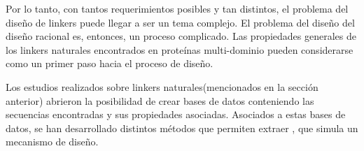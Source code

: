 Por lo tanto, con tantos requerimientos posibles y tan distintos, el problema del diseño de linkers puede llegar a ser un tema complejo.
El problema del diseño del diseño racional es, entonces, un proceso complicado.
Las propiedades generales de los linkers naturales encontrados en proteínas multi-dominio pueden considerarse como un primer paso hacia el proceso de diseño.
% 

Los estudios realizados sobre linkers naturales(mencionados en la sección anterior) abrieron la posibilidad de crear bases de datos conteniendo las secuencias encontradas y sus propiedades asociadas.
Asociados a estas bases de datos, se han desarrollado distintos métodos que permiten extraer  ,  que simula un mecanismo de diseño.

